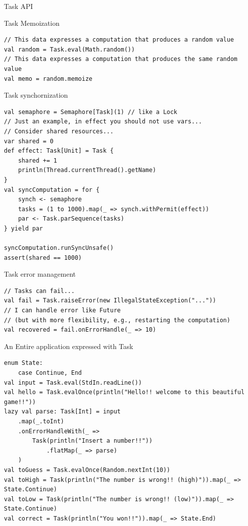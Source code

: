 \documentclass[presentation, 9pt]{beamer}\mode<presentation>{\usetheme{AMSBolognaFC}}
\begin{document}
\begin{frame}{Task API}
\begin{alertblock}{Task Memoization}
\begin{tcolorbox}[left=0pt, top=0pt, bottom=0pt]
								 \begin{verbatim}
// This data expresses a computation that produces a random value
val random = Task.eval(Math.random())
// This data expresses a computation that produces the same random value
val memo = random.memoize
								 \end{verbatim}
							 \end{tcolorbox}
					 \end{alertblock}
					 \begin{alertblock}{Task synchornization}
						\begin{tcolorbox}[left=0pt, top=0pt, bottom=0pt]
									 \begin{verbatim}
val semaphore = Semaphore[Task](1) // like a Lock
// Just an example, in effect you should not use vars... 
// Consider shared resources...
var shared = 0 
def effect: Task[Unit] = Task {
	shared += 1
	println(Thread.currentThread().getName)
}
val syncComputation = for {
	synch <- semaphore
	tasks = (1 to 1000).map(_ => synch.withPermit(effect))
	par <- Task.parSequence(tasks)
} yield par

syncComputation.runSyncUnsafe()
assert(shared == 1000)
									 \end{verbatim}
								 \end{tcolorbox}
						 \end{alertblock}
\begin{alertblock}{Task error management}
	\begin{tcolorbox}[left=0pt, top=0pt, bottom=0pt]
										 \begin{verbatim}
// Tasks can fail...
val fail = Task.raiseError(new IllegalStateException("..."))
// I can handle error like Future 
// (but with more flexibility, e.g., restarting the computation)
val recovered = fail.onErrorHandle(_ => 10)
										 \end{verbatim}
									 \end{tcolorbox}
							 \end{alertblock}
\begin{alertblock}{An Entire application expressed with Task}
	\begin{tcolorbox}[left=0pt, top=0pt, bottom=0pt]
					\begin{verbatim}
enum State:
	case Continue, End
val input = Task.eval(StdIn.readLine())
val hello = Task.evalOnce(println("Hello!! welcome to this beautiful game!!"))
lazy val parse: Task[Int] = input
	.map(_.toInt)
	.onErrorHandleWith(_ =>
		Task(println("Insert a number!!"))
			.flatMap(_ => parse)
	)
val toGuess = Task.evalOnce(Random.nextInt(10))
val toHigh = Task(println("The number is wrong!! (high)")).map(_ => State.Continue)
val toLow = Task(println("The number is wrong!! (low)")).map(_ => State.Continue)
val correct = Task(println("You won!!")).map(_ => State.End)


\end{verbatim}
\end{tcolorbox}
\end{alertblock}
\end{frame}
\end{document}
